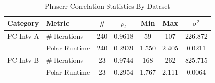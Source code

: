 \begin{table}[t]
    \centering
    \caption{Phaserr Correlation Statistics By Dataset}
    \begin{tabular}{llccccc}
        \toprule
        \textbf{Category} & \textbf{Metric} & \textbf{\#} & $\rho_t$ & \textbf{Min} & \textbf{Max} & $\sigma^2$ \\
        \midrule
        PC-Intv-A & \# Iterations & 240 & 0.9618 & 59 & 107 & 226.872 \\
         & Polar Runtime & 240 & 0.2939 & 1.550 & 2.405 & 0.0211 \\
        PC-Intv-B & \# Iterations & 23 & 0.9744 & 168 & 262 & 825.715 \\
         & Polar Runtime & 23 & 0.2954 & 1.767 & 2.111 & 0.0064 \\
        \bottomrule
    \end{tabular}
    \label{tab:phaserr-correlation-by-dataset}
\end{table}
